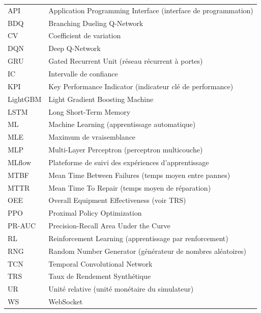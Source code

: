 \begin{tabularx}{\linewidth}{@{}P{2.4cm} L@{}}
\toprule
{} &  \\
\midrule
API & Application Programming Interface (interface de programmation) \\
BDQ & Branching Dueling Q-Network \\
CV & Coefficient de variation \\
DQN & Deep Q-Network \\
GRU & Gated Recurrent Unit (réseau récurrent à portes) \\
IC & Intervalle de confiance \\
KPI & Key Performance Indicator (indicateur clé de performance) \\
LightGBM & Light Gradient Boosting Machine \\
LSTM & Long Short-Term Memory \\
ML & Machine Learning (apprentissage automatique) \\
MLE & Maximum de vraisemblance \\
MLP & Multi-Layer Perceptron (perceptron multicouche) \\
MLflow & Plateforme de suivi des expériences d'apprentissage \\
MTBF & Mean Time Between Failures (temps moyen entre pannes) \\
MTTR & Mean Time To Repair (temps moyen de réparation) \\
OEE & Overall Equipment Effectiveness (voir TRS) \\
PPO & Proximal Policy Optimization \\
PR-AUC & Precision-Recall Area Under the Curve \\
RL & Reinforcement Learning (apprentissage par renforcement) \\
RNG & Random Number Generator (générateur de nombres aléatoires) \\
TCN & Temporal Convolutional Network \\
TRS & Taux de Rendement Synthétique \\
UR & Unité relative (unité monétaire du simulateur) \\
WS & WebSocket \\
\bottomrule
\end{tabularx}
